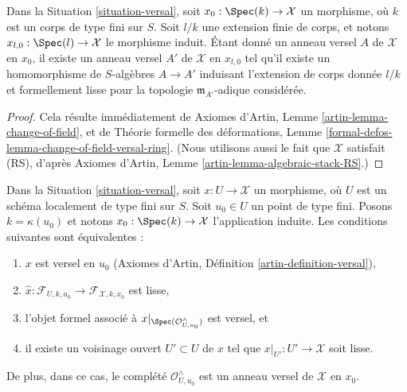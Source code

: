 \begin{lemma}
\label{lemma-versal-ring-field-extension}
Dans la Situation \ref{situation-versal}, soit $x_0 : \Spec(k) \to \mathcal{X}$
un morphisme, où $k$ est un corps de type fini sur $S$.
Soit $l/k$ une extension finie de corps, et notons
$x_{l, 0} : \Spec(l) \to \mathcal{X}$ le morphisme induit.
Étant donné un anneau versel $A$ de $\mathcal{X}$ en $x_0$, il existe
un anneau versel $A'$ de $\mathcal{X}$ en $x_{l, 0}$ tel
qu'il existe un homomorphisme de $S$-algèbres $A \to A'$ induisant
l'extension de corps donnée $l/k$ et formellement lisse pour la topologie $\mathfrak m_{A'}$-adique
considérée.
\end{lemma}

\begin{proof}
Cela résulte immédiatement de
Axiomes d'Artin, Lemme \ref{artin-lemma-change-of-field},
et de
Théorie formelle des déformations, Lemme
\ref{formal-defos-lemma-change-of-field-versal-ring}.
(Nous utilisons aussi le fait que $\mathcal{X}$ satisfait (RS), d'après
Axiomes d'Artin, Lemme \ref{artin-lemma-algebraic-stack-RS}.)
\end{proof}

\begin{lemma}
\label{lemma-compare-versal-ring-completion}
Dans la Situation \ref{situation-versal}, soit $x : U \to \mathcal{X}$ un
morphisme, où $U$ est un schéma localement de type fini sur $S$.
Soit $u_0 \in U$ un point de type fini.
Posons $k = \kappa(u_0)$ et notons $x_0 : \Spec(k) \to \mathcal{X}$
l'application induite. Les conditions suivantes sont équivalentes :
\begin{enumerate}
\item $x$ est versel en $u_0$
(Axiomes d'Artin, Définition \ref{artin-definition-versal}),
\item $\hat x : \mathcal{F}_{U, k, u_0} \to \mathcal{F}_{\mathcal{X}, k, x_0}$
est lisse,
\item l'objet formel associé à
$x|_{\Spec(\mathcal{O}_{U, u_0}^\wedge)}$ est versel, et
\item il existe un voisinage ouvert $U' \subset U$ de $x$ tel que
$x|_{U'} : U' \to \mathcal{X}$ soit lisse.
\end{enumerate}
De plus, dans ce cas, le complété $\mathcal{O}_{U, u_0}^\wedge$
est un anneau versel de $\mathcal{X}$ en $x_0$.
\end{lemma}


